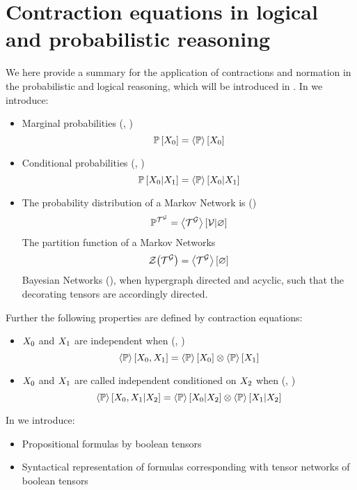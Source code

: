 \chapter{Contraction equations in logical and probabilistic reasoning}

We here provide a summary for the application of contractions and normation in the probabilistic and logical reasoning, which will be introduced in .
In  we introduce:
\begin{itemize}
	\item Marginal probabilities (, )
		\[ \mathbb{P}\left[X_{0}\right] = \left\langle \mathbb{P}\right\rangle \left[ X_{0} \right] \]
	\item Conditional probabilities (, )
		\[ \mathbb{P}\left[X_{0}|X_{1}\right] = \left\langle \mathbb{P}\right\rangle \left[ X_{0} | X_{1} \right] \]
	\item The probability distribution of a Markov Network is ()
		\begin{align*}
			\mathbb{P}^{\mathcal{T}^{\mathcal{G}}} = \left\langle \mathcal{T}^{\mathcal{G}}\right\rangle \left[ \mathcal{V} | \varnothing \right]
		\end{align*}
		The partition function of a Markov Networks
		\begin{align*}
			\mathcal{Z}{\left(\mathcal{T}^{\mathcal{G}}\right)} = \left\langle \mathcal{T}^{\mathcal{G}}\right\rangle \left[ \varnothing \right]
		\end{align*}
		Bayesian Networks (), when hypergraph directed and acyclic, such that the decorating tensors are accordingly directed.
\end{itemize}

Further the following properties are defined by contraction equations:
\begin{itemize}
	\item $X_{0}$ and $X_{1}$ are independent when (, )
		\[  \left\langle \mathbb{P}\right\rangle \left[ X_{0},X_{1} \right]
		=  \left\langle \mathbb{P}\right\rangle \left[ X_{0} \right]
			\otimes  \left\langle \mathbb{P}\right\rangle \left[ X_{1} \right] \]
	\item $X_{0}$ and $X_{1}$ are called independent conditioned on $X_{2}$ when (, )
		\[ \left\langle \mathbb{P}\right\rangle \left[ X_{0},X_{1} | X_{2} \right]
		= \left\langle \mathbb{P}\right\rangle \left[ X_{0} | X_{2} \right]
		\otimes \left\langle \mathbb{P}\right\rangle \left[ X_{1} | X_{2} \right] \]
\end{itemize}

In  we introduce:
\begin{itemize}
	\item Propositional formulas by boolean tensors
	\item Syntactical representation of formulas corresponding with tensor networks of boolean tensors
\end{itemize}
